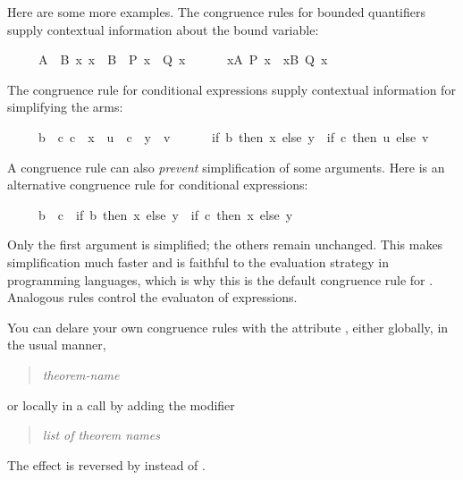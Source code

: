 \begin{isabellebody}
\begin{isamarkuptext}
Here are some more examples.  The congruence rules for bounded
quantifiers supply contextual information about the bound variable:
\begin{isabelle}%
\ \ \ \ \ {\isasymlbrakk}A\ {\isacharequal}\ B{\isacharsemicolon}\ {\isasymAnd}x{\isachardot}\ x\ {\isasymin}\ B\ {\isasymLongrightarrow}\ P\ x\ {\isacharequal}\ Q\ x{\isasymrbrakk}\isanewline
\ \ \ \ \ {\isasymLongrightarrow}\ {\isacharparenleft}{\isasymforall}x{\isasymin}A{\isachardot}\ P\ x{\isacharparenright}\ {\isacharequal}\ {\isacharparenleft}{\isasymforall}x{\isasymin}B{\isachardot}\ Q\ x{\isacharparenright}%
\end{isabelle}
The congruence rule for conditional expressions supply contextual
information for simplifying the arms:
\begin{isabelle}%
\ \ \ \ \ {\isasymlbrakk}b\ {\isacharequal}\ c{\isacharsemicolon}\ c\ {\isasymLongrightarrow}\ x\ {\isacharequal}\ u{\isacharsemicolon}\ {\isasymnot}\ c\ {\isasymLongrightarrow}\ y\ {\isacharequal}\ v{\isasymrbrakk}\isanewline
\ \ \ \ \ {\isasymLongrightarrow}\ {\isacharparenleft}if\ b\ then\ x\ else\ y{\isacharparenright}\ {\isacharequal}\ {\isacharparenleft}if\ c\ then\ u\ else\ v{\isacharparenright}%
\end{isabelle}
A congruence rule can also \emph{prevent} simplification of some arguments.
Here is an alternative congruence rule for conditional expressions:
\begin{isabelle}%
\ \ \ \ \ b\ {\isacharequal}\ c\ {\isasymLongrightarrow}\ {\isacharparenleft}if\ b\ then\ x\ else\ y{\isacharparenright}\ {\isacharequal}\ {\isacharparenleft}if\ c\ then\ x\ else\ y{\isacharparenright}%
\end{isabelle}
Only the first argument is simplified; the others remain unchanged.
This makes simplification much faster and is faithful to the evaluation
strategy in programming languages, which is why this is the default
congruence rule for . Analogous rules control the evaluaton of
 expressions.

You can delare your own congruence rules with the attribute ,
either globally, in the usual manner,
\begin{quote}
 \textit{theorem-name} 
\end{quote}
or locally in a  call by adding the modifier
\begin{quote}
 \textit{list of theorem names}
\end{quote}
The effect is reversed by  instead of .


\end{isamarkuptext}
\end{isabellebody}

